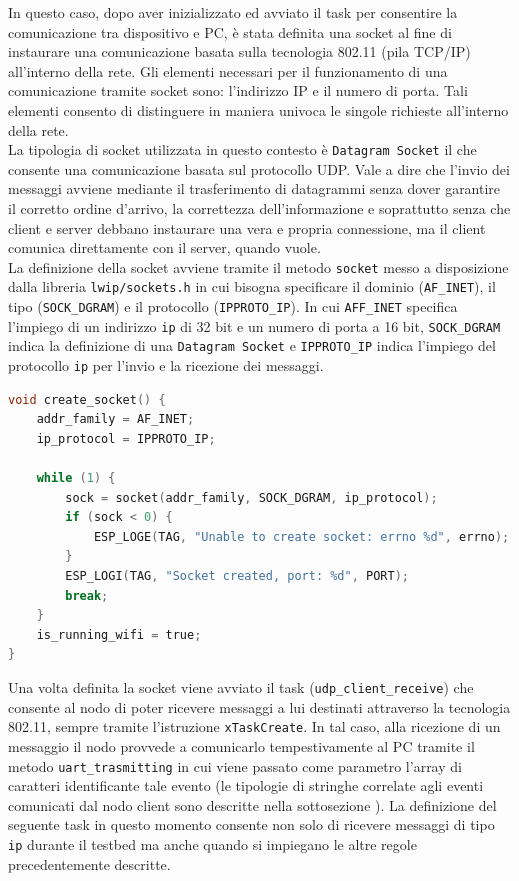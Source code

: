 \noindent In questo caso, dopo aver inizializzato ed avviato il task per consentire la comunicazione tra dispositivo e PC, è stata definita una socket al fine di instaurare una comunicazione basata sulla tecnologia 802.11 (pila TCP/IP) all’interno della rete. Gli elementi necessari per il funzionamento di una comunicazione tramite socket sono: l'indirizzo IP e il numero di porta. Tali elementi consento di distinguere in maniera univoca le singole richieste all'interno della rete.\\
La tipologia di socket utilizzata in questo contesto è \texttt{Datagram Socket} il che consente una comunicazione basata sul protocollo UDP. Vale a dire che l'invio dei messaggi avviene mediante il trasferimento di datagrammi senza dover garantire il corretto ordine d'arrivo, la correttezza dell'informazione e soprattutto senza che client e server debbano instaurare una vera e propria connessione, ma il client comunica direttamente con il server, quando vuole.\\

\noindent La definizione della socket avviene tramite il metodo \texttt{socket} messo a disposizione dalla libreria \texttt{lwip/sockets.h} in cui bisogna specificare il dominio (\texttt{AF\_INET}), il tipo (\texttt{SOCK\_DGRAM}) e il protocollo (\texttt{IPPROTO\_IP}). In cui \texttt{AFF\_INET} specifica l'impiego di un indirizzo \texttt{ip} di 32 bit e un numero di porta a 16 bit, \texttt{SOCK\_DGRAM} indica la definizione di una \texttt{Datagram Socket} e \texttt{IPPROTO\_IP} indica l'impiego del protocollo \texttt{ip} per l'invio e la ricezione dei messaggi.

\begin{lstlisting}[language=C, caption= creazione della socket]
void create_socket() {
    addr_family = AF_INET;
    ip_protocol = IPPROTO_IP;

    while (1) {
        sock = socket(addr_family, SOCK_DGRAM, ip_protocol);
        if (sock < 0) {
            ESP_LOGE(TAG, "Unable to create socket: errno %d", errno);
        }
        ESP_LOGI(TAG, "Socket created, port: %d", PORT);
        break;
    }
    is_running_wifi = true;
}
\end{lstlisting}

\noindent Una volta definita la socket viene avviato il task (\texttt{udp\_client\_receive}) che consente al nodo di poter ricevere messaggi a lui destinati attraverso la tecnologia 802.11, sempre tramite l'istruzione \texttt{xTaskCreate}. In tal caso, alla ricezione di un messaggio il nodo provvede a comunicarlo tempestivamente al PC tramite il metodo \texttt{uart\_trasmitting} in cui viene passato come parametro l'array di caratteri identificante tale evento (le tipologie di stringhe correlate agli eventi comunicati dal nodo client sono descritte nella sottosezione ). La definizione del seguente task in questo momento consente non solo di ricevere messaggi di tipo \texttt{ip} durante il testbed ma anche quando si impiegano le altre regole precedentemente descritte.\\

